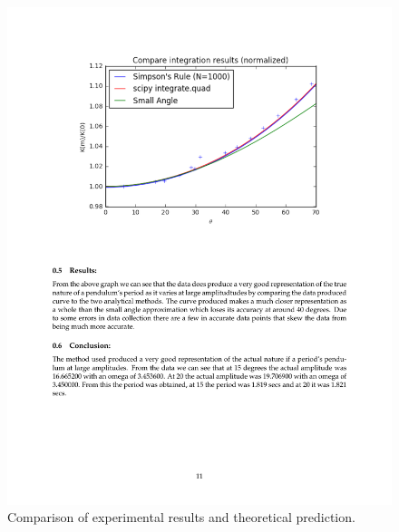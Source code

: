\documentclass[journal, a4paper]{IEEEtran}
\begin{document}
	\begin{figure}[!hbt]
		\begin{center}
		\includegraphics[width=\columnwidth]{pendulum}
		\caption{Comparison of experimental results and theoretical prediction.}
		\label{fig:tf_plot}
		\end{center}
	\end{figure}
\end{document}
